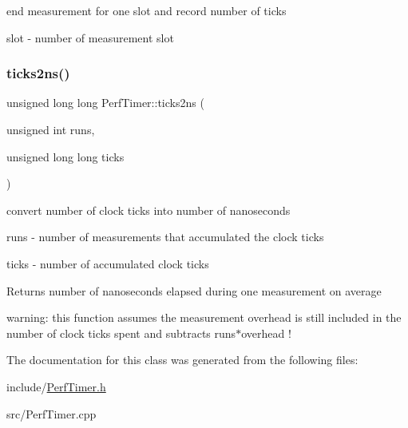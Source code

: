 end measurement for one slot and record number of ticks 

\begin{DoxyItemize}
\item {\ttfamily slot} -\/ number of measurement slot \end{DoxyItemize}
\mbox{\label{classPerfTimer_a8da85ffde4f6f94a12c1fd9b789ded74}} 
\subsubsection{\texorpdfstring{ticks2ns()}{ticks2ns()}}
{\footnotesize\ttfamily unsigned long long Perf\+Timer\+::ticks2ns (\begin{DoxyParamCaption}\item[{unsigned int}]{runs,  }\item[{unsigned long long}]{ticks }\end{DoxyParamCaption})\hspace{0.3cm}{\ttfamily [static]}}



convert number of clock ticks into number of nanoseconds 

\begin{DoxyItemize}
\item {\ttfamily runs} -\/ number of measurements that accumulated the clock ticks \item {\ttfamily ticks} -\/ number of accumulated clock ticks \begin{DoxyReturn}{Returns}
number of nanoseconds elapsed during one measurement on average
\end{DoxyReturn}
warning\+: this function assumes the measurement overhead is still included in the number of clock ticks spent and subtracts runs$\ast$overhead ! \end{DoxyItemize}


The documentation for this class was generated from the following files\+:\begin{DoxyCompactItemize}
\item 
include/\hyperlink{PerfTimer_8h}{Perf\+Timer.\+h}\item 
src/Perf\+Timer.\+cpp\end{DoxyCompactItemize}
